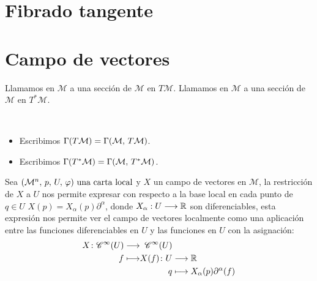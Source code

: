 






\section{Fibrado tangente}\label{sec:fibrado-tangente}



\section{Campo de vectores}\label{sec:campo-vectores}
\begin{definition}
	Llamamos  en $\mathcal{M}$ a una sección de $\mathcal{M}$ en $T\mathcal{M}$.
	Llamamos  en $\mathcal{M}$ a una sección de $\mathcal{M}$ en $T^*
	\mathcal{M}$.
\end{definition}

\begin{notation}
	\
	\begin{itemize}
		\item Escribimos $\Gamma(T\mathcal{M}) = \Gamma(\mathcal{M},\thinspace T\mathcal{M})$.
		\item Escribimos $\Gamma(T^*\mathcal{M}) = \Gamma(\mathcal{M},\thinspace T^*\mathcal{M})$.
	\end{itemize}
\end{notation}

Sea $(\mathcal{M}^n,\thinspace p,\thinspace U,\thinspace \varphi)\textmd{ una carta local}$ y $X$ un campo de vectores en $\mathcal{M}$, la restricción de $X$ a $U$
nos permite expresar con respecto a la base local en cada punto de $q\in U$ $X(p)
=X_{\alpha}(p)\partial^\alpha$, donde $X_\alpha:U\longrightarrow \mathbb{R}$ son diferenciables, esta expresión nos permite ver el
campo de vectores localmente como una aplicación entre las funciones diferenciables en $U$ y las funciones en $U$ con
la asignación:
\begin{equation}
	\label{eq:campo-vectores-homomorfismo}
	\begin{alignedat}{2}
		X\colon\mathscr{C}^\infty(U) & \longrightarrow & \mathscr{C}^\infty(U) \\
		f & \longmapsto & X(f)\colon U & \longrightarrow\mathbb{R} \\
		& & q &\longmapsto X_\alpha(p)\partial^\alpha(f)
	\end{alignedat}
\end{equation}

